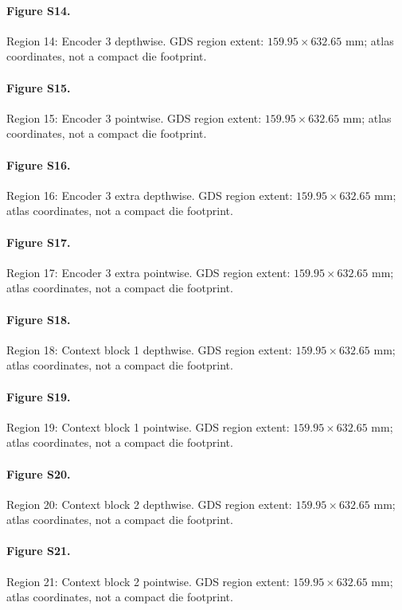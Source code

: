 \paragraph{Figure S14.} Region 14: Encoder 3 depthwise. GDS region extent: $159.95\times632.65$ mm; atlas coordinates, not a compact die footprint.

\paragraph{Figure S15.} Region 15: Encoder 3 pointwise. GDS region extent: $159.95\times632.65$ mm; atlas coordinates, not a compact die footprint.

\paragraph{Figure S16.} Region 16: Encoder 3 extra depthwise. GDS region extent: $159.95\times632.65$ mm; atlas coordinates, not a compact die footprint.

\paragraph{Figure S17.} Region 17: Encoder 3 extra pointwise. GDS region extent: $159.95\times632.65$ mm; atlas coordinates, not a compact die footprint.

\paragraph{Figure S18.} Region 18: Context block 1 depthwise. GDS region extent: $159.95\times632.65$ mm; atlas coordinates, not a compact die footprint.

\paragraph{Figure S19.} Region 19: Context block 1 pointwise. GDS region extent: $159.95\times632.65$ mm; atlas coordinates, not a compact die footprint.

\paragraph{Figure S20.} Region 20: Context block 2 depthwise. GDS region extent: $159.95\times632.65$ mm; atlas coordinates, not a compact die footprint.

\paragraph{Figure S21.} Region 21: Context block 2 pointwise. GDS region extent: $159.95\times632.65$ mm; atlas coordinates, not a compact die footprint.

